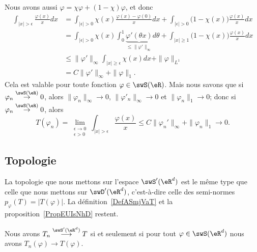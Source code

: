 \begin{example}
    Nous avons aussi \( \varphi=\chi\varphi+(1-\chi)\varphi\), et donc
    \begin{subequations}
        \begin{align}
            \int_{| x |>\epsilon}\frac{ \varphi(x) }{ x }dx&=\int_{| \epsilon |>0}\chi(x)\frac{ \varphi(x)-\varphi(0) }{ x }dx+\int_{| \epsilon |>0}\big( 1-\chi(x) \big)\frac{ \varphi(x) }{ x }dx\\
            &=\int_{| \epsilon |>0}\chi(x)\int_0^1\underbrace{\varphi'(\theta x)}_{\leq \| \varphi' \|_{\infty}}d\theta+\int_{| x |\geq 1}\big( 1-\chi(x) \big)\frac{ \varphi(x) }{ x }dx\\
            &\leq\| \varphi' \|_{\infty}\int_{| x |\geq \epsilon}\chi(x)dx+\| \varphi \|_{L^1}\\
            &=C\| \varphi' \|_{\infty}+\| \varphi \|_{1}.
        \end{align}
    \end{subequations}
    Cela est valable pour toute fonction \( \varphi\in\swS(\eR)\). Mais nous savons que si \( \varphi_n\stackrel{\swS(\eR)}{\to}0\), alors \( \| \varphi_n \|_{\infty}\to 0\), \( \| \varphi'_n \|_{\infty}\to 0\) et \( \| \varphi_n \|_1\to 0\); donc si \( \varphi_n\stackrel{\swS(\eR)}{\to}0\), alors
    \begin{equation}
        T(\varphi_n)=\lim_{\substack{\epsilon\to 0\\\epsilon>0}}\int_{| x |>\epsilon}\frac{ \varphi(x) }{ x }\leq C\| \varphi_n' \|_{\infty}+\| \varphi_n \|_1\to 0.
    \end{equation}
\end{example}

\subsection{Topologie}

La topologie que nous mettons sur l'espace \( \swS'(\eR^d)\) est le même type que celle que nous mettons sur \( \swD'(\eR^d)\), c'est-à-dire celle des semi-normes \( p_{\varphi}(T)=| T(\varphi) |\). La définition~\ref{DefASmjVaT} et la proposition~\ref{PropEUIsNhD} restent.

\begin{proposition} \label{PropQAuJstI}
    Nous avons \( T_n\stackrel{\swS'(\eR^d)}{\longrightarrow}T\) si et seulement si pour tout \( \varphi\in\swS(\eR^d)\) nous avons \( T_n(\varphi)\to T(\varphi)\).
\end{proposition}

